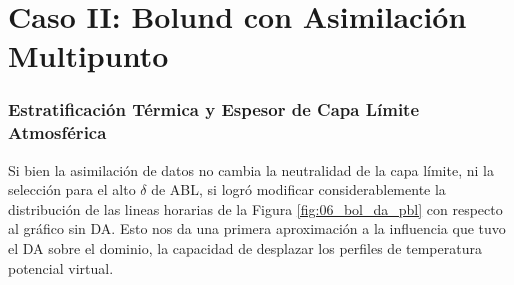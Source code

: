 \vspace*{\fill}
\newpage





























\section{Caso II: Bolund con Asimilación Multipunto}
\subsubsection{Estratificación Térmica y Espesor de Capa Límite Atmosférica}
Si bien la asimilación de datos no cambia la neutralidad de la capa límite, ni la selección para el alto $\delta$ de ABL, si logró modificar considerablemente la distribución de las lineas horarias  de la Figura \ref{fig:06_bol_da_pbl} con respecto al gráfico sin DA. Esto nos da una primera aproximación a la influencia que tuvo el DA sobre el dominio, la capacidad de desplazar los perfiles de temperatura potencial virtual.

